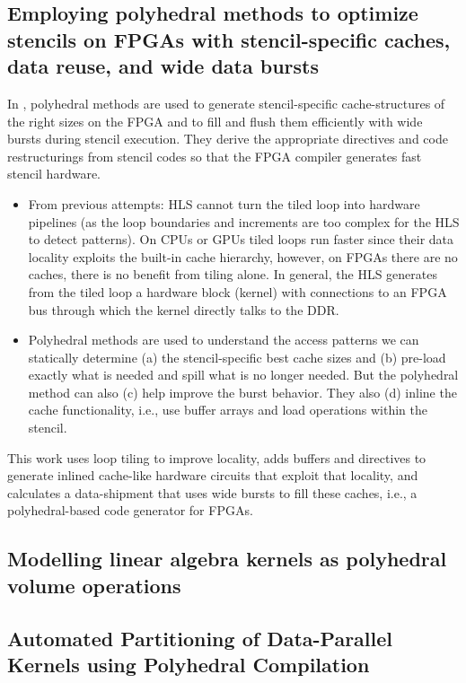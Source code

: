 \subsection{Employing polyhedral methods to optimize stencils on FPGAs with stencil-specific caches, data reuse, and wide data bursts}
In \cite{mayer24-fpgas}, polyhedral methods are used to generate stencil-specific cache-structures of the right sizes on the FPGA and to fill and flush them efficiently with wide bursts during stencil execution. They derive the appropriate directives and code restructurings from stencil codes so that the FPGA compiler generates fast stencil hardware.
\begin{itemize}
    \item From previous attempts: HLS cannot turn the tiled loop into hardware pipelines (as the loop boundaries and increments are too complex for the HLS to detect patterns). On CPUs or GPUs tiled loops run faster since their data locality exploits the built-in cache hierarchy, however, on FPGAs there are no caches, there is no benefit from tiling alone. In general, the HLS generates from the tiled loop a hardware block (kernel) with connections to an FPGA bus through which the kernel directly talks to the DDR.
    \item Polyhedral methods are used to understand the access patterns we can statically determine (a) the stencil-specific best cache sizes and (b) pre-load exactly what is needed and spill what is no longer needed. But the polyhedral method can also (c) help improve the burst behavior. They also (d) inline the cache functionality, i.e., use buffer arrays and load operations within the stencil.
\end{itemize}
This work uses loop tiling to improve locality, adds buffers and directives to generate inlined cache-like hardware circuits that exploit that locality, and calculates a data-shipment that uses wide bursts to fill these caches, i.e., a polyhedral-based code generator for FPGAs.

\subsection{Modelling linear algebra kernels as polyhedral volume operations}

\subsection{Automated Partitioning of Data-Parallel Kernels using Polyhedral Compilation}

